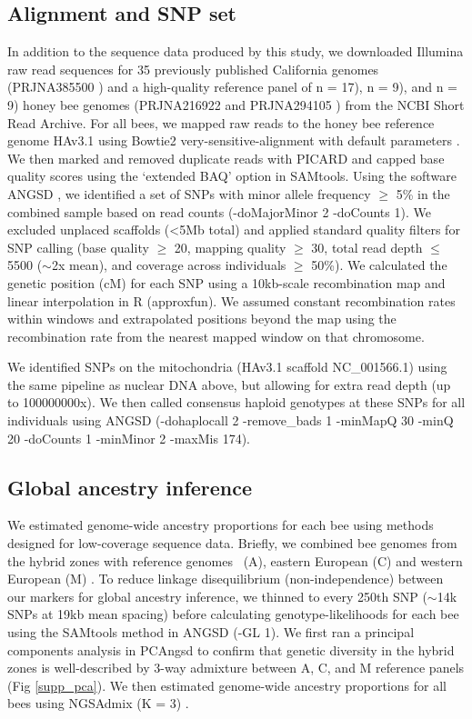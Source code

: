 \subsection*{Alignment and SNP set}
In addition to the sequence data produced by this study, we downloaded Illumina raw read sequences for 35 previously published California genomes (PRJNA385500 \cite{Cridland:2018fx}) and a high-quality reference panel of   n = 17),  n = 9), and  n = 9) honey bee genomes (PRJNA216922 \cite{Harpur:2014ei} and PRJNA294105 \cite{Cridland:2017el}) from the NCBI Short Read Archive. For all bees, we mapped raw reads to the honey bee reference genome HAv3.1 \cite{Wallberg:2019fd} using Bowtie2 very-sensitive-alignment with default parameters \cite{Langmead:2012jh}. We then marked and removed duplicate reads with PICARD and capped base quality scores using the ‘extended BAQ' option in SAMtools. Using the software ANGSD \cite{Korneliussen:2014_ANGSD}, we identified a set of SNPs with minor allele frequency $\geq$ 5\% in the combined sample based on read counts (-doMajorMinor 2 -doCounts 1). We excluded unplaced scaffolds (\textless 5Mb total) and applied standard quality filters for SNP calling (base quality $\geq$ 20, mapping quality $\geq$ 30, total read depth $\leq$ 5500 ($\sim$2x mean), and coverage across individuals $\geq$ 50\%). We calculated the genetic position (cM) for each SNP using a 10kb-scale recombination map \cite{Jones:2019wg} and linear interpolation in R (approxfun). We assumed constant recombination rates within windows and extrapolated positions beyond the map using the recombination rate from the nearest mapped window on that chromosome.

We identified SNPs on the mitochondria (HAv3.1 scaffold NC\_001566.1) using the same pipeline as nuclear DNA above, but allowing for extra read depth (up to 100000000x). We then called consensus haploid genotypes at these SNPs for all individuals using ANGSD (-dohaplocall 2 -remove\_bads 1 -minMapQ 30 -minQ 20 -doCounts 1 -minMinor 2 -maxMis 174).

\subsection*{Global ancestry inference}
We estimated genome-wide ancestry proportions for each bee using methods designed for low-coverage sequence data. Briefly, we combined bee genomes from the hybrid zones with reference genomes  \scutellata\ (A), eastern European (C) and western European (M) . To reduce linkage disequilibrium (non-independence) between our markers for global ancestry inference, we thinned to every 250th SNP ($\sim$14k SNPs at 19kb mean spacing) before calculating genotype-likelihoods for each bee using the SAMtools method in ANGSD (-GL 1). We first ran a principal components analysis in PCAngsd \cite{Meisner:2018_pcangsd} to confirm that genetic diversity in the hybrid zones is well-described by 3-way admixture between A, C, and M reference panels (Fig \ref{supp_pca}). We then estimated genome-wide ancestry proportions for all bees using NGSAdmix (K = 3) \cite{Skotte:2013_NGSadmix}.

